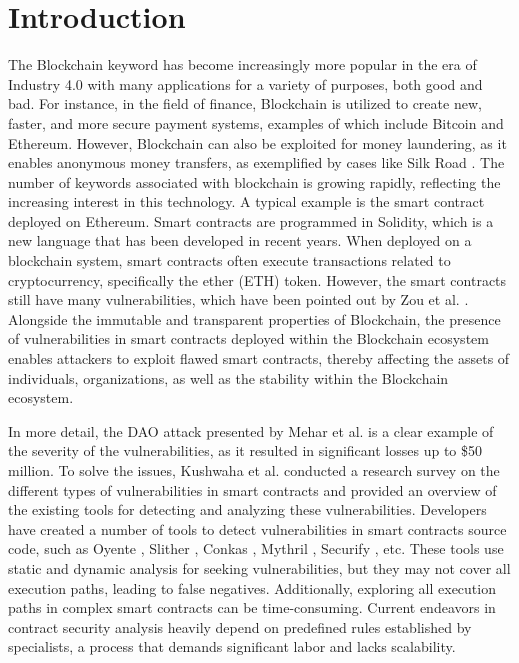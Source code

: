 \section{Introduction}
The Blockchain keyword has become increasingly more popular in the era of Industry 4.0 with many applications for a variety of purposes, both good and bad. For instance, in the field of finance, Blockchain is utilized to create new, faster, and more secure payment systems, examples of which include Bitcoin and Ethereum. However, Blockchain can also be exploited for money laundering, as it enables anonymous money transfers, as exemplified by cases like Silk Road \cite{Ghimiray_2023}. The number of keywords associated with blockchain is growing rapidly, reflecting the increasing interest in this technology. A typical example is the smart contract deployed on Ethereum. Smart contracts are programmed in Solidity, which is a new language that has been developed in recent years. When deployed on a blockchain system, smart contracts often execute transactions related to cryptocurrency, specifically the ether (ETH) token. However, the smart contracts still have many vulnerabilities, which have been pointed out by Zou et al. \cite{wei_chall_opport}. Alongside the immutable and transparent properties of Blockchain, the presence of vulnerabilities in smart contracts deployed within the Blockchain ecosystem enables attackers to exploit flawed smart contracts, thereby affecting the assets of individuals, organizations, as well as the stability within the Blockchain ecosystem.

In more detail, the DAO attack \cite{Meh_dao_attack} presented by Mehar et al. is a clear example  of the severity of the vulnerabilities, as it resulted in significant losses up to \$50 million. To solve the issues, Kushwaha et al. \cite{Kush_ETH_review} conducted a research survey on the different types of vulnerabilities in smart contracts and provided an overview of the existing tools for detecting and analyzing these vulnerabilities. Developers have created a number of tools to detect vulnerabilities in smart contracts source code, such as Oyente \cite{bar_smart2contract}, Slither \cite{Kush_ETH_review}, Conkas \cite{Nveloso}, Mythril \cite{Consensys}, Securify \cite{Tsan_secfy}, etc. These tools use static and dynamic analysis for seeking vulnerabilities, but they may not cover all execution paths, leading to false negatives. Additionally, exploring all execution paths in complex smart contracts can be time-consuming. Current endeavors in contract security analysis heavily depend on predefined rules established by specialists, a process that demands significant labor and lacks scalability.
 
